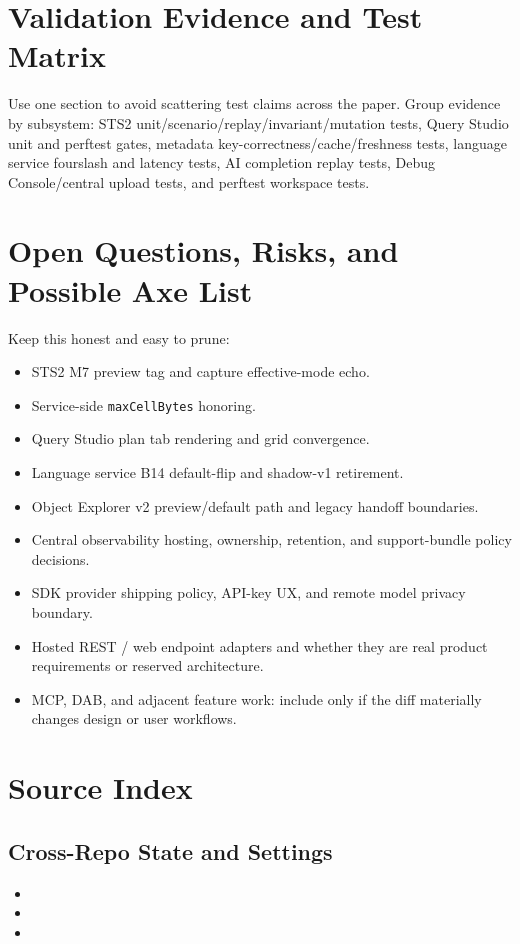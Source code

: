 \documentclass[11pt]{article}
\newcommand{\code}[1]{\texttt{#1}}
\begin{document}
\section{Validation Evidence and Test Matrix}

Use one section to avoid scattering test claims across the paper.  Group evidence by subsystem: STS2 unit/scenario/replay/invariant/mutation tests, Query Studio unit and perftest gates, metadata key-correctness/cache/freshness tests, language service fourslash and latency tests, AI completion replay tests, Debug Console/central upload tests, and perftest workspace tests.

\section{Open Questions, Risks, and Possible Axe List}

Keep this honest and easy to prune:

\begin{itemize}
	\item STS2 M7 preview tag and capture effective-mode echo.
	\item Service-side \code{maxCellBytes} honoring.
	\item Query Studio plan tab rendering and grid convergence.
	\item Language service B14 default-flip and shadow-v1 retirement.
	\item Object Explorer v2 preview/default path and legacy handoff boundaries.
	\item Central observability hosting, ownership, retention, and support-bundle policy decisions.
	\item SDK provider shipping policy, API-key UX, and remote model privacy boundary.
	\item Hosted REST / web endpoint adapters and whether they are real product requirements or reserved architecture.
	\item MCP, DAB, and adjacent feature work: include only if the diff materially changes design or user workflows.
\end{itemize}

\appendix

\section{Source Index}

\subsection{Cross-Repo State and Settings}
\begin{itemize}
	\item {}
	\item {}
	\item {}
\end{itemize}
\end{document}
